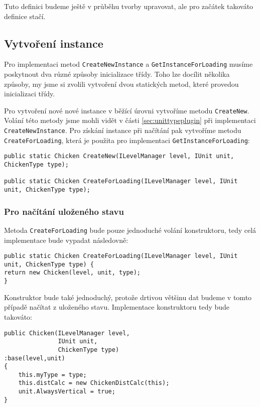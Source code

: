 Tuto definici budeme ještě v průběhu tvorby upravovat, ale pro začátek takováto definice stačí.


\subsection{Vytvoření instance}

Pro implementaci metod \texttt{CreateNewInstance} a \texttt{GetInstanceForLoading} musíme poskytnout dva různé způsoby inicializace třídy. Toho lze docílit několika způsoby, my jsme si zvolili vytvoření dvou statických metod, které provedou inicializaci třídy.

Pro vytvoření nové nové instance v běžící úrovni vytvoříme metodu \texttt{CreateNew}. Volání této metody jsme mohli vidět v části \ref{sec:unittypeplugin} při implementaci \texttt{CreateNewInstance}. Pro získání instance při načítání pak vytvoříme metodu \texttt{CreateForLoading}, která je použita pro implementaci \texttt{GetInstanceForLoading}:

\begin{lstlisting}
public static Chicken CreateNew(ILevelManager level, IUnit unit, ChickenType type);

public static Chicken CreateForLoading(ILevelManager level, IUnit unit, ChickenType type);
\end{lstlisting}


\subsubsection{Pro načítání uloženého stavu}

Metoda \texttt{CreateForLoading} bude pouze jednoduché volání konstruktoru, tedy celá implementace bude vypadat následovně:

\begin{lstlisting}
public static Chicken CreateForLoading(ILevelManager level, IUnit unit, ChickenType type) {
return new Chicken(level, unit, type);
}
\end{lstlisting}

Konstruktor bude také jednoduchý, protože drtivou většinu dat budeme v tomto případě načítat z uloženého stavu. Implementace konstruktoru tedy bude takováto:

\begin{lstlisting}
public Chicken(ILevelManager level, 
			   IUnit unit, 
			   ChickenType type) 
:base(level,unit)
{
	this.myType = type;
	this.distCalc = new ChickenDistCalc(this);	
	unit.AlwaysVertical = true;
}
\end{lstlisting}

